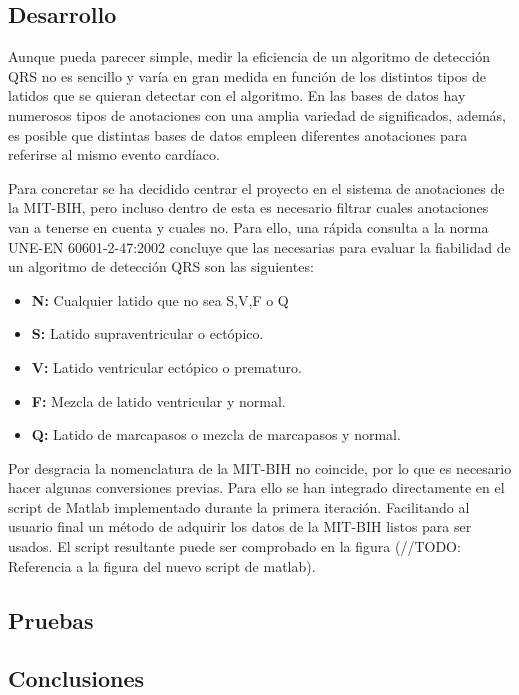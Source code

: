     \subsection{Desarrollo}
        Aunque pueda parecer simple, medir la eficiencia de un algoritmo de detección QRS no es sencillo y varía en gran medida en función de los distintos tipos de latidos que se quieran detectar con el algoritmo. En las bases de datos hay numerosos tipos de anotaciones con una amplia variedad de significados, además, es posible que distintas bases de datos empleen diferentes anotaciones para referirse al mismo evento cardíaco. 
     
        Para concretar se ha decidido centrar el proyecto en el sistema de anotaciones de la MIT-BIH, pero incluso dentro de esta es necesario filtrar cuales anotaciones van a tenerse en cuenta y cuales no. Para ello, una rápida consulta a la norma UNE-EN 60601-2-47:2002 concluye que las necesarias para evaluar la fiabilidad de un algoritmo de detección QRS son las siguientes:
        
        \begin{itemize}
            \item \textbf{N:} Cualquier latido que no sea S,V,F o Q
            \item \textbf{S:} Latido supraventricular o ectópico.
            \item \textbf{V:} Latido ventricular ectópico o prematuro.
            \item \textbf{F:} Mezcla de latido ventricular y normal.
            \item \textbf{Q:} Latido de marcapasos o mezcla de marcapasos y normal.
        \end{itemize}
        
        
        Por desgracia la nomenclatura de la MIT-BIH no coincide, por lo que es necesario hacer algunas conversiones previas. Para ello se han integrado directamente en el script de Matlab implementado durante la primera iteración. Facilitando al usuario final un método de adquirir los datos de la MIT-BIH listos para ser usados. El script resultante puede ser comprobado en la figura (//TODO: Referencia a la figura del nuevo script de matlab).
        
        \begin{minipage}{0.9 \linewidth}
        \end{minipage}
     
    \subsection{Pruebas}
    \subsection{Conclusiones}